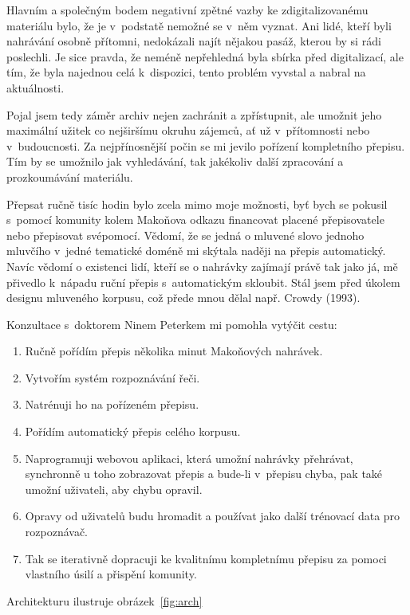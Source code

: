 Hlavním a společným bodem negativní zpětné vazby ke zdigitalizovanému materiálu
bylo, že je v~podstatě nemožné se v~něm vyznat. Ani lidé, kteří byli nahrávání
osobně přítomni, nedokázali najít nějakou pasáž, kterou by si rádi poslechli. Je
sice pravda, že neméně nepřehledná byla sbírka před digitalizací, ale tím, že
byla najednou celá k~dispozici, tento problém vyvstal a nabral na aktuálnosti.

Pojal jsem tedy záměr archiv nejen zachránit a zpřístupnit, ale umožnit jeho
maximální užitek co nejširšímu okruhu zájemců, ať už v~přítomnosti nebo
v~budoucnosti.
Za nejpřínosnější počin se mi jevilo pořízení kompletního
přepisu. Tím by se umožnilo jak vyhledávání, tak jakékoliv další zpracování a
prozkoumávání materiálu.

Přepsat ručně tisíc hodin bylo zcela mimo moje možnosti, byť bych se pokusil
s~pomocí komunity kolem Makoňova odkazu financovat placené přepisovatele nebo
přepisovat svépomocí. Vědomí, že se jedná o mluvené slovo jednoho mluvčího
v~jedné tematické doméně mi skýtala naději na přepis automatický. Navíc vědomí o
existenci lidí, kteří se o nahrávky zajímají právě tak jako já, mě přivedlo
k~nápadu ruční přepis s~automatickým skloubit.
Stál jsem před úkolem designu mluveného korpusu, což přede mnou dělal
např. Crowdy (1993)\cite{crowdy1993spoken}.

Konzultace s~doktorem Ninem Peterkem mi pomohla vytýčit cestu:
\begin{enumerate}
\item{Ručně pořídím přepis několika minut Makoňových nahrávek.}
\item{Vytvořím systém rozpoznávání řeči.}
\item{Natrénuji ho na pořízeném přepisu.}
\item{Pořídím automatický přepis celého korpusu.}
\item{Naprogramuji webovou aplikaci, která umožní nahrávky přehrávat,
synchronně u toho zobrazovat přepis a bude-li v~přepisu chyba, pak také umožní
uživateli, aby chybu opravil.}
\item{Opravy od uživatelů budu hromadit a používat jako další trénovací data pro
rozpoznávač.}
\item{Tak se iterativně dopracuji ke kvalitnímu kompletnímu přepisu za pomoci
vlastního úsilí a přispění komunity.}
\end{enumerate}

Architekturu ilustruje obrázek~\ref{fig:arch}

